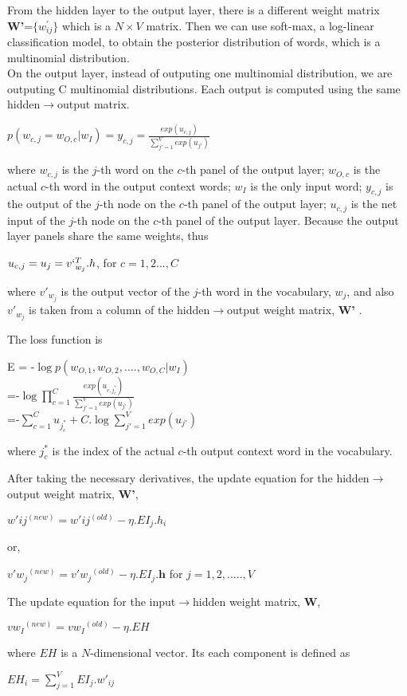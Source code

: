 From the hidden layer to the output layer, there is a different weight matrix \textbf{W'}=$\{w_{ij}^{'}\}$ which is a $N \times V$ matrix. Then we can use soft-max, a log-linear classification model, to obtain the posterior distribution of words, which is a multinomial distribution.\\
On the output layer, instead of outputing one multinomial distribution, we are outputing C multinomial distributions. Each output is computed using the same hidden$\rightarrow$output matrix.
\begin{center}
$p(w_{c,j}=w_{O,c}|w_I)=y_{c,j}=\frac{exp(u_{c,j})}{\sum_{j'=1}^{V}exp(u_{j'})}$
\end{center}
where $w_{c,j}$ is the $j$-th word on the $c$-th panel of the output layer; $w_{O,c}$ is the actual $c$-th word in the output context words; $w_I$ is the only input word; $y_{c,j}$ is the output of the $j$-th node on the $c$-th panel of the output layer; $u_{c,j}$ is the net input of the $j$-th node on the $c$-th panel of the output layer.
Because the output layer panels share the same weights, thus
\begin{center}
$u_{c,j}=u_j=v`_{w_j}^T.h$, for $c=1,2...,C$
\end{center}
where $v'_{w_j}$ is the output vector of the $j$-th word in the vocabulary, $w_j$, and also $v'_{w_j}$ is taken from a column of the hidden$\rightarrow$output weight matrix, \textbf{W'} .

The loss function is
\begin{center}
E = -$\log p(w_{O,1},w_{O,2},....,w_{O,C}|w_I)$\\
=-$\log \prod_{c=1}^{C}\frac{exp(u_{c,j_{c}^{*	}})}{\sum_{j'=1}^{V}exp(u_{j'})}$\\
=-$\sum_{c=1}^{C} u_{j_{c}^{*}}+C.\log \sum_{j'=1}^{V}exp(u_{j'})$
\end{center}
where $j_{c}^{*}$ is the index of the actual $c$-th output context word in the vocabulary.

After taking the necessary derivatives, the update equation for the hidden$\rightarrow$output weight matrix, \textbf{W'},
\begin{center}
$w'{ij}^{(new)}=w'{ij}^{(old)}-\eta .EI_j.h_i$
\end{center}
or,
\begin{center}
$v'{w_j}^{(new)}=v'{w_j}^{(old)}-\eta .EI_j.\textbf{h}$ for $j=1,2,.....,V$
\end{center}

The update equation for the input$\rightarrow$hidden weight matrix, \textbf{W},
\begin{center}
$v{w_I}^{(new)}=v{w_I}^{(old)}-\eta .EH$
\end{center}
where $EH$ is a $N$-dimensional vector. Its each component is defined as
\begin{center}
$EH_i=\sum_{j=1}^{V}EI_j.w'_{ij}$
\end{center}

